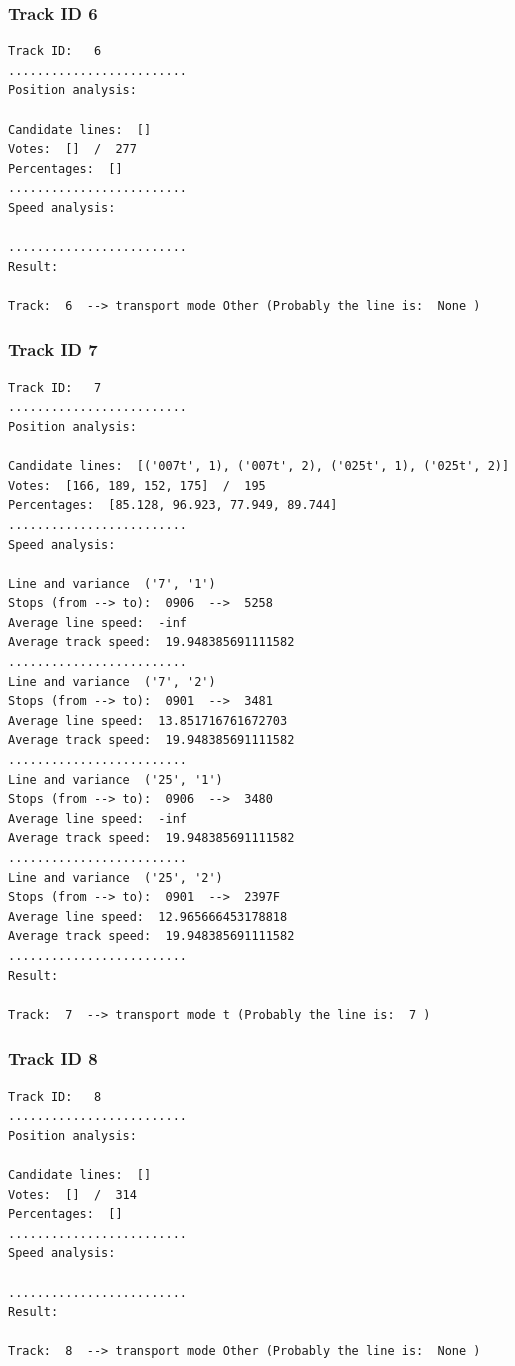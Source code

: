\documentclass{article}
\begin{document}
\subsubsection{Track ID 6}
\begin{verbatim}
Track ID:   6
.........................
Position analysis: 

Candidate lines:  [] 
Votes:  []  /  277
Percentages:  []
.........................
Speed analysis: 

.........................
Result: 

Track:  6  --> transport mode Other (Probably the line is:  None )
\end{verbatim}
\subsubsection{Track ID 7}
\begin{verbatim}
Track ID:   7
.........................
Position analysis: 

Candidate lines:  [('007t', 1), ('007t', 2), ('025t', 1), ('025t', 2)] 
Votes:  [166, 189, 152, 175]  /  195
Percentages:  [85.128, 96.923, 77.949, 89.744]
.........................
Speed analysis: 

Line and variance  ('7', '1') 
Stops (from --> to):  0906  -->  5258
Average line speed:  -inf
Average track speed:  19.948385691111582
.........................
Line and variance  ('7', '2') 
Stops (from --> to):  0901  -->  3481
Average line speed:  13.851716761672703
Average track speed:  19.948385691111582
.........................
Line and variance  ('25', '1') 
Stops (from --> to):  0906  -->  3480
Average line speed:  -inf
Average track speed:  19.948385691111582
.........................
Line and variance  ('25', '2') 
Stops (from --> to):  0901  -->  2397F
Average line speed:  12.965666453178818
Average track speed:  19.948385691111582
.........................
Result: 

Track:  7  --> transport mode t (Probably the line is:  7 )
\end{verbatim}
\subsubsection{Track ID 8}
\begin{verbatim}
Track ID:   8
.........................
Position analysis: 

Candidate lines:  [] 
Votes:  []  /  314
Percentages:  []
.........................
Speed analysis: 

.........................
Result: 

Track:  8  --> transport mode Other (Probably the line is:  None )
\end{verbatim}
\end{document}
